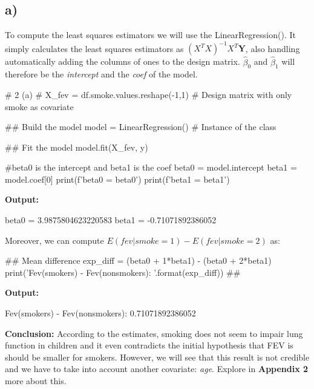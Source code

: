 \documentclass[a4paper]{article}
\begin{document}
\subsection{a)}
To compute the least squares estimators we will use the LinearRegression(). It simply calculates the least squares estimators as $(X^{T}X)^{-1}X^{T}\textbf{Y}$, also handling automatically adding the columns of ones to the design matrix. $\hat{\beta}_0$ and $\hat{\beta}_1$ will therefore be the \textit{intercept} and the \textit{coef} of the model.
\begin{python}
	# 2 (a) #
	X_fev = df.smoke.values.reshape(-1,1) # Design matrix with only smoke as covariate
	
	## Build the model
	model = LinearRegression() # Instance of the class
	
	## Fit the model
	model.fit(X_fev, y)
	
	#beta0 is the intercept and beta1 is the coef
	beta0 = model.intercept
	beta1 = model.coef[0]
	print(f'beta0 = {beta0}')
	print(f'beta1 = {beta1}')
\end{python}
\textbf{Output:}
\begin{python}
	beta0 = 3.9875804623220583
	beta1 = -0.71071892386052
\end{python}
Moreover, we can compute $E(fev|smoke=1)-E(fev|smoke=2)$ as:
\begin{python}
	## Mean difference
	exp_diff = (beta0 + 1*beta1) - (beta0 + 2*beta1)
	print('Fev(smokers) - Fev(nonsmokers): {}'.format(exp_diff))
	##
\end{python}
\textbf{Output:}
\begin{python}
	Fev(smokers) - Fev(nonsmokers): 0.71071892386052
\end{python}
\textbf{Conclusion:}
According to the estimates, smoking does not seem to impair lung function in children and it even contradicts the initial hypothesis that FEV is should be smaller for smokers. However, we will see that this result is not credible and we have to take into account another covariate: \textit{age}. Explore in \textbf{Appendix 2} more about this.
\end{document}
